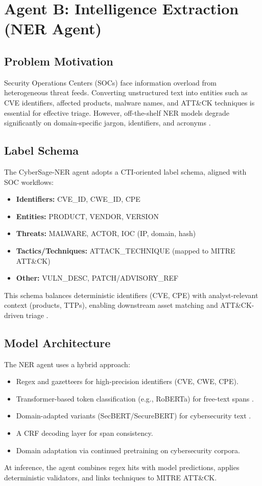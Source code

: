 \section{Agent B: Intelligence Extraction (NER Agent)}
\label{sec:agentB-ner}

\subsection{Problem Motivation}
Security Operations Centers (SOCs) face information overload from heterogeneous threat feeds. Converting unstructured text into entities such as CVE identifiers, affected products, malware names, and ATT\&CK techniques is essential for effective triage. However, off-the-shelf NER models degrade significantly on domain-specific jargon, identifiers, and acronyms \cite{devlin2018bert, liu2019roberta, jehangir2023ner, recentner2024}.

\subsection{Label Schema}
The CyberSage-NER agent adopts a CTI-oriented label schema, aligned with SOC workflows:
\begin{itemize}
    \item \textbf{Identifiers:} CVE\_ID, CWE\_ID, CPE
    \item \textbf{Entities:} PRODUCT, VENDOR, VERSION
    \item \textbf{Threats:} MALWARE, ACTOR, IOC (IP, domain, hash)
    \item \textbf{Tactics/Techniques:} ATTACK\_TECHNIQUE (mapped to MITRE ATT\&CK)
    \item \textbf{Other:} VULN\_DESC, PATCH/ADVISORY\_REF
\end{itemize}
This schema balances deterministic identifiers (CVE, CPE) with analyst-relevant context (products, TTPs), enabling downstream asset matching and ATT\&CK-driven triage \cite{mitre_attack, cve_reference}.

\subsection{Model Architecture}
The NER agent uses a hybrid approach:
\begin{itemize}
    \item Regex and gazetteers for high-precision identifiers (CVE, CWE, CPE).
    \item Transformer-based token classification (e.g., RoBERTa) for free-text spans \cite{liu2019roberta}.
    \item Domain-adapted variants (SecBERT/SecureBERT) for cybersecurity text \cite{secbert2020, securebert2021}.
    \item A CRF decoding layer for span consistency.
    \item Domain adaptation via continued pretraining on cybersecurity corpora.
\end{itemize}
At inference, the agent combines regex hits with model predictions, applies deterministic validators, and links techniques to MITRE ATT\&CK.

